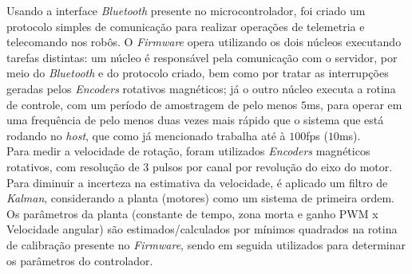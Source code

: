 Usando a interface \textit{Bluetooth} presente no microcontrolador, foi criado um  protocolo simples de comunicação para realizar operações de telemetria e telecomando nos robôs. O \textit{Firmware} opera utilizando os dois núcleos  executando tarefas distintas: um núcleo é responsável pela comunicação  com o servidor, por meio do \textit{Bluetooth} e do protocolo criado, bem como  por tratar as interrupções geradas pelos \textit{Encoders} rotativos magnéticos;  já o outro núcleo executa a rotina de controle, com um período de amostragem de pelo menos $5$ms, para operar em uma frequência de pelo menos duas vezes mais rápido que o sistema que está rodando no \emph{host}, que como já mencionado trabalha até à $100$fps ($10$ms).\\

Para medir a velocidade de rotação, foram utilizados \textit{Encoders} magnéticos  rotativos, com resolução de $3$ pulsos por canal por revolução do eixo do motor. Para diminuir a  incerteza na estimativa da velocidade, é aplicado um filtro de \textit{Kalman},  considerando a planta (motores) como um sistema de primeira ordem. Os  parâmetros da planta (constante de tempo, zona morta e ganho PWM x  Velocidade angular) são estimados/calculados por mínimos quadrados na  rotina de calibração presente no \textit{Firmware}, sendo em seguida utilizados  para determinar os parâmetros do controlador.

